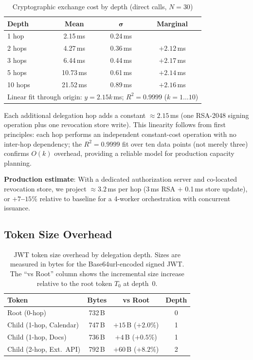 \documentclass[journal]{IEEEtran}
\begin{document}
\begin{table}[h]
\caption{Cryptographic exchange cost by depth (direct calls, $N=30$)}
\label{tab:hopcosts}
\centering
\footnotesize
\begin{tabular}{lccc}
\toprule
\textbf{Depth} & \textbf{Mean} & $\boldsymbol\sigma$ & \textbf{Marginal} \\
\midrule
1 hop  &  2.15\,ms & 0.24\,ms &          \\
2 hops &  4.27\,ms & 0.36\,ms & $+2.12$\,ms \\
3 hops &  6.44\,ms & 0.44\,ms & $+2.17$\,ms \\
5 hops & 10.73\,ms & 0.61\,ms & $+2.14$\,ms \\
10 hops & 21.52\,ms & 0.89\,ms & $+2.16$\,ms \\
\midrule
\multicolumn{4}{l}{\scriptsize
  Linear fit through origin: $y = 2.15k$\,ms;\; $R^2 = 0.9999$ ($k=1\ldots10$)}
\end{tabular}
\end{table}

Each additional delegation hop adds a constant $\approx 2.15$\,ms (one RSA-2048
signing operation plus one revocation store write). This linearity follows from
first principles: each hop performs an independent constant-cost operation with no
inter-hop dependency; the $R^2 = 0.9999$ fit over ten data points (not merely
three) confirms $O(k)$ overhead, providing a reliable model for production
capacity planning.

\textbf{Production estimate}: With a dedicated authorization server and
co-located revocation store, we project $\approx 3.2$\,ms per hop (3\,ms RSA
$+$ 0.1\,ms store update), or \textbf{$+7$--$15\%$} relative to baseline for
a 4-worker orchestration with concurrent issuance.

\subsection{Token Size Overhead}

\begin{table}[h]
\caption{JWT token size overhead by delegation depth. Sizes are measured in bytes
for the Base64url-encoded signed JWT. The ``vs Root'' column shows the incremental
size increase relative to the root token $T_0$ at depth~0.}
\label{tab:tokensizes}
\centering
\footnotesize
\begin{tabular}{lccc}
\toprule
\textbf{Token} & \textbf{Bytes} & \textbf{vs Root} & \textbf{Depth} \\
\midrule
Root (0-hop)             & 732\,B &                      & 0 \\
Child (1-hop, Calendar)  & 747\,B & $+15$\,B ($+2.0\%$)   & 1 \\
Child (1-hop, Docs)      & 736\,B & $+4$\,B ($+0.5\%$)    & 1 \\
Child (2-hop, Ext.\ API) & 792\,B & $+60$\,B ($+8.2\%$)   & 2 \\
\bottomrule
\end{tabular}
\end{table}
\end{document}
